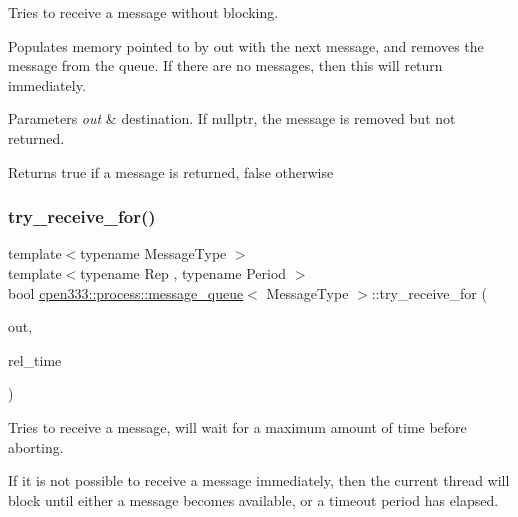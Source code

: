 Tries to receive a message without blocking. 

Populates memory pointed to by {\ttfamily out} with the next message, and removes the message from the queue. If there are no messages, then this will return immediately.


\begin{DoxyParams}{Parameters}
{\em out} & destination. If {\ttfamily nullptr}, the message is removed but not returned. \\
\hline
\end{DoxyParams}
\begin{DoxyReturn}{Returns}
{\ttfamily true} if a message is returned, {\ttfamily false} otherwise 
\end{DoxyReturn}
\mbox{\label{classcpen333_1_1process_1_1message__queue_a4264047863208a01109569f62d093885}} 
\subsubsection{\texorpdfstring{try\+\_\+receive\+\_\+for()}{try\_receive\_for()}}
{\footnotesize\ttfamily template$<$typename Message\+Type $>$ \\
template$<$typename Rep , typename Period $>$ \\
bool \hyperlink{classcpen333_1_1process_1_1message__queue}{cpen333\+::process\+::message\+\_\+queue}$<$ Message\+Type $>$\+::try\+\_\+receive\+\_\+for (\begin{DoxyParamCaption}\item[{Message\+Type $\ast$}]{out,  }\item[{std\+::chrono\+::duration$<$ Rep, Period $>$ \&}]{rel\+\_\+time }\end{DoxyParamCaption})\hspace{0.3cm}{\ttfamily [inline]}}



Tries to receive a message, will wait for a maximum amount of time before aborting. 

If it is not possible to receive a message immediately, then the current thread will block until either a message becomes available, or a timeout period has elapsed.


